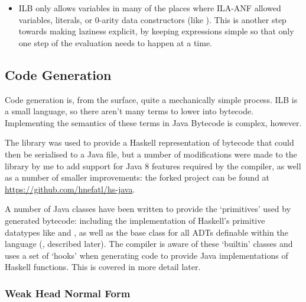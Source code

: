 \documentclass[dissertation.tex]{subfiles}
\begin{document}
{{{\begin{itemize}
{            }
            \item
            {

                ILB only allows variables in many of the places where ILA-ANF allowed variables, literals, or 0-arity
                data constructors (like ). This is another step towards making laziness explicit, by
                keeping expressions simple so that only one step of the evaluation needs to happen at a time.

            }
            \end{itemize}

        }
    }
    \subsection{Code Generation}
    {
        
        Code generation is, from the surface, quite a mechanically simple process. ILB is a small language, so there
        aren't many terms to lower into bytecode. Implementing the semantics of these terms in Java Bytecode is complex,
        however.

        The  library was used to provide a Haskell representation of bytecode that could then be
        serialised to a Java  file, but a number of modifications were made to the library by me to
        add support for Java 8 features required by the compiler, as well as a number of smaller improvements: the
        forked project can be found at \url{https://github.com/hnefatl/hs-java}.

        A number of Java classes have been written to provide the `primitives' used by generated bytecode: including the
        implementation of Haskell's primitive datatypes like  and , as well as the base class
        for all ADTs definable within the language (, described later). The compiler is aware of
        these `builtin' classes and uses a set of `hooks' when generating code to provide Java implementations of
        Haskell functions. This is covered in more detail later.


        \subsubsection{Weak Head Normal Form}
        {

}}}
\end{document}

